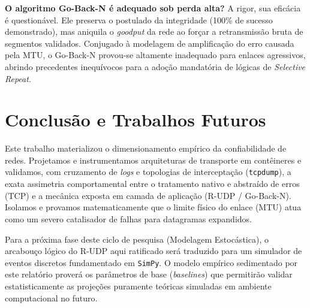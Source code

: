 \documentclass[12pt]{article}
\begin{document}
\textbf{O algoritmo Go-Back-N é adequado sob perda alta?} A rigor, sua eficácia é questionável. Ele preserva o postulado da 
integridade (100\% de sucesso demonstrado), mas aniquila o \emph{goodput} da rede ao forçar a retransmissão 
bruta de segmentos validados. Conjugado à modelagem de amplificação do erro causada pela MTU, 
o Go-Back-N provou-se altamente inadequado para enlaces agressivos, abrindo precedentes inequívocos para 
a adoção mandatória de lógicas de \emph{Selective Repeat}.

\section{Conclusão e Trabalhos Futuros}

Este trabalho materializou o dimensionamento empírico da confiabilidade de redes. Projetamos e instrumentamos 
arquiteturas de transporte em contêineres e validamos, com cruzamento de \emph{logs} e topologias de interceptação 
(\texttt{tcpdump}), a exata assimetria comportamental entre o tratamento nativo e abstraído de erros (TCP) 
e a mecânica exposta em camada de aplicação (R-UDP / Go-Back-N). Isolamos e provamos matematicamente que o 
limite físico do enlace (MTU) atua como um severo catalisador de falhas para datagramas expandidos.

Para a próxima fase deste ciclo de pesquisa (Modelagem Estocástica), o arcabouço lógico do R-UDP aqui ratificado 
será traduzido para um simulador de eventos discretos fundamentado em \texttt{SimPy}. O modelo empírico 
sedimentado por este relatório proverá os parâmetros de base (\emph{baselines}) que permitirão validar 
estatisticamente as projeções puramente teóricas simuladas em ambiente computacional no futuro.



\end{document}
